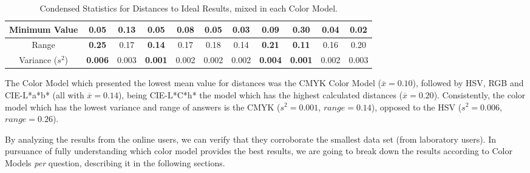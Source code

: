 \begin{table}[htbp]
{\begin{tabular}{@{}ccccccccccc@{}}
    \multicolumn{1}{c|}{Minimum Value}                                                 & 0.05  & 0.13       & 0.05                                   & 0.08  & \multicolumn{1}{c|}{0.05}                                  & 0.03                                  & 0.09       & 0.30                                   & 0.04                                  & \multicolumn{1}{c|}{0.02}  \\ \midrule
    \multicolumn{1}{c|}{Range}                                                         & \cellcolor[HTML]{FD6864}\textbf{0.25}  & 0.17       & \cellcolor[HTML]{32CB00}\textbf{0.14}  & 0.17  & \multicolumn{1}{c|}{0.18}                                  & 0.14                                  & \cellcolor[HTML]{FD6864}\textbf{0.21}       & \cellcolor[HTML]{32CB00}\textbf{0.11}  & 0.16                                  & \multicolumn{1}{c|}{0.20}  \\ \midrule
    \multicolumn{1}{c|}{Variance ($s^2$)}                                                      & \cellcolor[HTML]{FD6864}\textbf{0.006} & 0.003      & \cellcolor[HTML]{32CB00}\textbf{0.001} & 0.002 & \multicolumn{1}{c|}{0.002}                                 & 0.002                                 & \cellcolor[HTML]{FD6864}\textbf{0.004}      & \cellcolor[HTML]{32CB00}\textbf{0.001} & 0.002                                 & \multicolumn{1}{c|}{0.003} \\ \bottomrule
  \end{tabular}}
  \caption[Condensed Statistics for Distances to Ideal Results, mixed in each Color Model.]{Condensed Statistics for Distances to Ideal Results, mixed in each Color Model.}
  \vspace{-5pt}
  \label{table:colormodels_distances_labonline_statistics}
\end{table}
%
The Color Model which presented the lowest mean value for distances was the CMYK Color Model ($\overline{x} = 0.10$), followed by HSV, RGB and CIE-L*a*b* (all with $\overline{x} = 0.14$), being
CIE-L*C*h* the model which has the highest calculated distances ($\overline{x} = 0.20$). Consistently, the color model which has the lowest variance and range of answers is the CMYK ($s^2 = 0.001$,
$range = 0.14$), opposed to the HSV ($s^2 = 0.006$, $range = 0.26$). \par
%
By analyzing the results from the online users, we can verify that they corroborate the smallest data set (from laboratory users). In pursuance of fully understanding which color model provides the best results,
we are going to break down the results according to Color Models \emph{per} question, describing it in the following sections. \par
%
%
